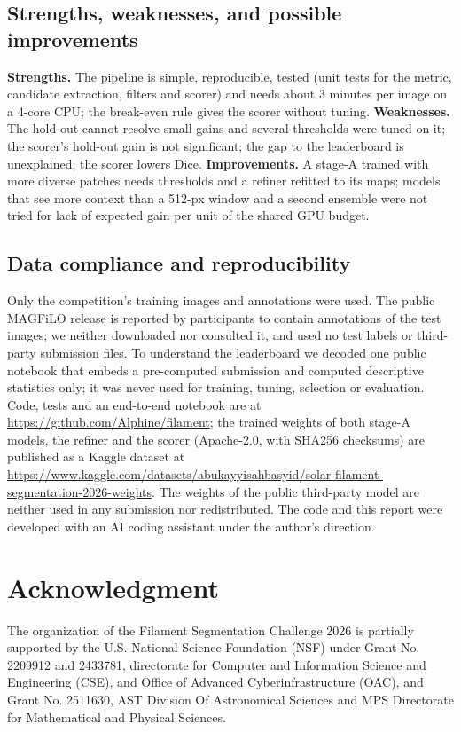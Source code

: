 \documentclass[sigconf]{acmart}
\begin{document}
\subsection{Strengths, weaknesses, and possible improvements}
\textbf{Strengths.} The pipeline is simple, reproducible, tested (unit tests for the metric, candidate extraction, filters and scorer) and needs about 3 minutes per image on a 4-core CPU; the break-even rule gives the scorer without tuning. \textbf{Weaknesses.} The hold-out cannot resolve small gains and several thresholds were tuned on it; the scorer's hold-out gain is not significant; the gap to the leaderboard is unexplained; the scorer lowers Dice. \textbf{Improvements.} A stage-A trained with more diverse patches needs thresholds and a refiner refitted to its maps; models that see more context than a 512-px window and a second ensemble were not tried for lack of expected gain per unit of the shared GPU budget.

\subsection{Data compliance and reproducibility}
Only the competition's training images and annotations were used. The public MAGFiLO release is reported by participants to contain annotations of the test images; we neither downloaded nor consulted it, and used no test labels or third-party submission files. To understand the leaderboard we decoded one public notebook that embeds a pre-computed submission and computed descriptive statistics only; it was never used for training, tuning, selection or evaluation. Code, tests and an end-to-end notebook are at \url{https://github.com/Alphine/filament}; the trained weights of both stage-A models, the refiner and the scorer (Apache-2.0, with SHA256 checksums) are published as a Kaggle dataset at \url{https://www.kaggle.com/datasets/abukayyisahbasyid/solar-filament-segmentation-2026-weights}. The weights of the public third-party model are neither used in any submission nor redistributed. The code and this report were developed with an AI coding assistant under the author's direction.

\section{Acknowledgment}\label{sec:acknowledgment}
    The organization of the Filament Segmentation Challenge 2026 is partially supported by the U.S. National Science Foundation (NSF) under Grant No. 2209912 and 2433781, directorate for Computer and Information Science and Engineering (CSE), and Office of Advanced Cyberinfrastructure (OAC), and Grant No. 2511630, AST Division Of Astronomical Sciences and MPS Directorate for Mathematical and Physical Sciences.
\end{document}
